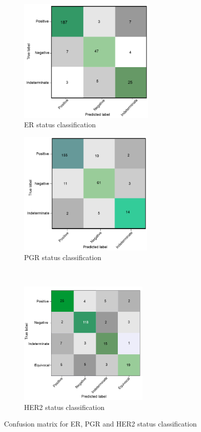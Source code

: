 \begin{figure}[h]
	\centering
	\begin{subfigure}{.49\linewidth}
		\centering
		\includegraphics[width=\linewidth,height=60mm]{images/conf_er.png}
		\caption{ER status classification}
        \label{fig:er_confusion}
	\end{subfigure}
	\begin{subfigure}{.49\linewidth}
		\centering
		\includegraphics[width=\linewidth,height=60mm]{images/conf_pgr.png}
		\caption{PGR status classification}
        \label{fig:pgr_confusion}
	\end{subfigure}\\[1ex]
	\begin{subfigure}{0.49\linewidth}
		\centering
		\includegraphics[width=\linewidth,height=60mm]{images/conf_her2.png}
		\caption{HER2 status classification }
        \label{fig:her2_confusion}
	\end{subfigure}
	\caption{Confusion matrix for ER, PGR and HER2 status classification~\cite{karimACCESS2019}} 
	\label{fig:multi_cms}
\end{figure}

